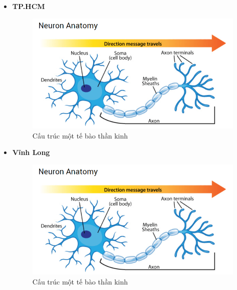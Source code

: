 \documentclass[12pt,a4paper,oneside]{book}
\numberwithin{equation}{chapter} %
\numberwithin{figure}{chapter} %
\numberwithin{table}{chapter} %
\begin{document}
\begin{itemize}
\item \textbf{TP.HCM}
\FloatBarrier
\begin{figure}[htp]
\begin{center}
\includegraphics[scale=0.8]{chap2/c2_figs/neuron.png}
\end{center}
\caption{Cấu trúc một tế bào thần kinh}
\label{fig:neuronsinhhoc}
\end{figure}
\FloatBarrier

\item \textbf{Vĩnh Long}
\FloatBarrier
\begin{figure}[htp]
\begin{center}
\includegraphics[scale=0.8]{chap2/c2_figs/neuron.png}
\end{center}
\caption{Cấu trúc một tế bào thần kinh}
\label{fig:neuronsinhhoc}
\end{figure}
\FloatBarrier


\end{itemize}
\end{document}
